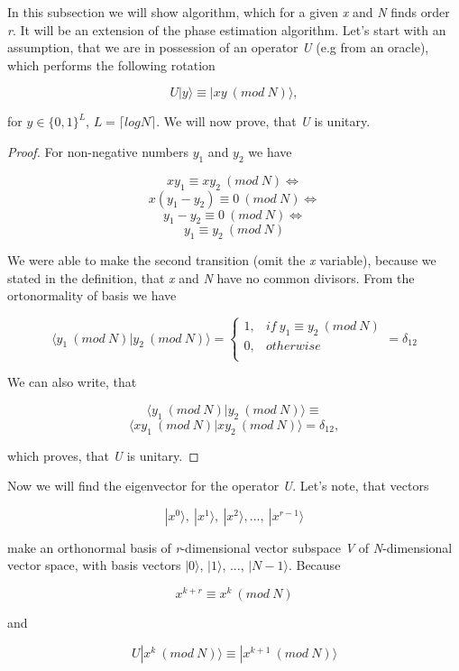 In this subsection we will show algorithm, which for a given \textit{x} and \textit{N} finds order \textit{r}. It will be an extension of the phase estimation algorithm. Let's start with an assumption, that we are in possession of an operator \textit{U} (e.g from an oracle), which performs the following rotation

\[ U|y\rangle \equiv |xy\ (mod\ N)\rangle,\]

for $y \in \{0, 1\}^L$, $L = \lceil log N \rceil$. We will now prove, that \textit{U} is unitary. 

\begin{proof}
For non-negative numbers $y_1$ and $y_2$ we have

\[ xy_1 \equiv xy_2\ (mod\ N) \Longleftrightarrow \]
\[ x(y_1 - y_2) \equiv 0\ (mod\ N) \Longleftrightarrow \]
\[ y_1 - y_2 \equiv 0\ (mod\ N) \Longleftrightarrow \]
\[ y_1 \equiv y_2\ (mod\ N) \]

We were able to make the second transition (omit the \textit{x} variable), because we stated in the definition, that \textit{x} and \textit{N} have no common divisors. From the ortonormality of basis we have

\[ \langle y_1\ (mod\ N)| y_2\ (mod\ N)\rangle = \begin{cases}
       1,  & if\ y_1 \equiv y_2\ (mod\ N) \\
       0, & otherwise \\
     \end{cases} = \delta_{12}\]

We can also write, that

\[ \langle y_1\ (mod\ N)| y_2\ (mod\ N)\rangle \equiv \]
\[ \langle xy_1\ (mod\ N)| xy_2\ (mod\ N)\rangle = \delta_{12},\]

which proves, that \textit{U} is unitary.
\end{proof}

Now we will find the eigenvector for the operator \textit{U}. Let's note, that vectors

\[ |x^0\rangle,\ |x^1\rangle,\ |x^2\rangle, ...,\ |x^{r-1}\rangle\]

make an orthonormal basis of \textit{r}-dimensional vector subspace \textit{V} of \textit{N}-dimensional vector space, with basis vectors $|0\rangle$, $|1\rangle$, ..., $|N - 1\rangle$. Because

\[ x^{k + r} \equiv x^k\ (mod\ N)\]

and

\[ U|x^k\ (mod\ N)\rangle \equiv |x^{k + 1}\ (mod\ N)\rangle\]


